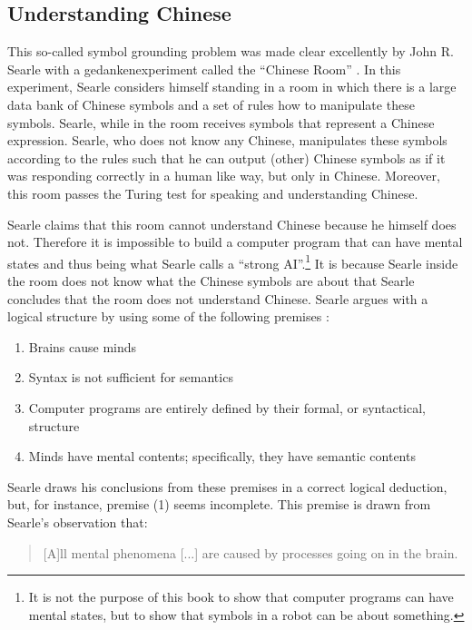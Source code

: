 \subsection{Understanding Chinese}This so-called symbol grounding problem was made clear excellently by John R. Searle with a gedankenexperiment called the ``Chinese Room'' \citep{searle:1980}. In this experiment, Searle considers himself standing in a room in which there is a large data bank of Chinese symbols and a set of rules how to manipulate these symbols. Searle, while in the room receives symbols that represent a Chinese expression. Searle, who does not know any Chinese, manipulates these symbols according to the rules such that he can output (other) Chinese symbols as if it was responding correctly in a human like way, but only in Chinese. Moreover, this room passes the Turing test for speaking and understanding Chinese.

Searle claims that this room cannot understand Chinese because he himself does not. Therefore it is impossible to build a computer program that can have mental states and thus being what Searle calls a ``strong AI''.\footnote{It is not the purpose of this book to show that computer programs can have mental states, but to show that symbols in a robot can be about something.} It is because Searle inside the room does not know what the Chinese symbols are about that Searle concludes that the room does not understand Chinese. Searle argues with a logical structure by using some of the following premises \cite[39]{searle:1984}:

\begin{enumerate}
\item Brains cause minds
\item Syntax is not sufficient for semantics
\item Computer programs are entirely defined by their formal, or syntactical, structure
\item Minds have mental contents; specifically, they have semantic contents
\end{enumerate}

Searle draws his conclusions from these premises in a correct logical deduction, but, for instance, premise (1) seems incomplete. This premise is drawn from Searle's observation that:

\begin{quote}
[A]ll mental phenomena [...] are caused by processes going on in the brain. \citep[18]{searle:1984}
\end{quote}

